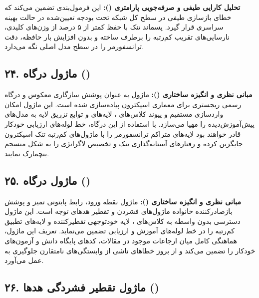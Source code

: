 \textbf{تحلیل کارایی طیفی و صرفه‌جویی پارامتری ():}
این فرمول‌بندی تضمین می‌کند که خطای بازسازی طیفی در سطح کل شبکه تحت بودجه تعیین‌شده در حالت بهینه سراسری قرار گیرد. پسماند تنک با حفظ کمتر از ۵ درصد از وزن‌های کلیدی، نارسایی‌های تقریب کم‌رتبه را برطرف ساخته و بدون افزایش بار حافظه، دقت ترانسفورمر را در سطح مدل اصلی نگه می‌دارد.



\subsection*{۲۴. ماژول درگاه  ()}

\textbf{مبانی نظری و انگیزه ساختاری ():}
ماژول  به عنوان پوشش سازگاری معکوس و درگاه رسمی ریجستری برای معماری اسپکترون پیاده‌سازی شده است. این ماژول امکان واردسازی مستقیم و پیوند کلاس‌های ، لایه‌های  و توابع تزریق لایه به مدل‌های پیش‌آموزش‌دیده را مهیا می‌سازد.
با استفاده از این درگاه، خط لوله‌های ارزیابی خودکار قادر خواهند بود لایه‌های متراکم ترانسفورمر را با ماژول‌های کم‌رتبه تنک اسپکترون جایگزین کرده و رفتارهای آستانه‌گذاری تنک و تخصیص لاگرانژی را به شکل منسجم بنچمارک نمایند.



\subsection*{۲۵. ماژول درگاه  ()}

\textbf{مبانی نظری و انگیزه ساختاری ():}
ماژول  نقطه ورود، رابط پایتونی تمیز و پوشش بازصادرکننده خانواده ماژول‌های فشردن و تقطیر هدهای توجه است. این ماژول دسترسی بدون واسطه به کلاس‌های ، لایه خودتوجهی تقطیرکننده  و لایه‌های تطبیق کم‌رتبه را در خط لوله‌های آموزش و ارزیابی تضمین می‌نماید.
تعریف این ماژول، هماهنگی کامل میان ارجاعات موجود در مقالات، کدهای پایگاه دانش و آزمون‌های خودکار را تضمین می‌کند و از بروز خطاهای ناشی از وابستگی‌های نامتقارن جلوگیری به عمل می‌آورد.



\subsection*{۲۶. ماژول تقطیر فشردگی هدها  ()}

